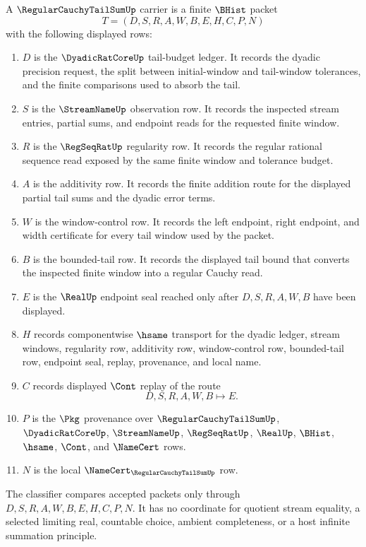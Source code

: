 \begin{definition}
\label{def:regular-cauchy-tail-sum-carrier}
A $\RegularCauchyTailSumUp$ carrier is a finite $\BHist$ packet
$$
T=(D,S,R,A,W,B,E,H,C,P,N)
$$
with the following displayed rows:
\begin{enumerate}
\item $D$ is the $\DyadicRatCoreUp$ tail-budget ledger. It records the dyadic precision request, the split between initial-window and tail-window tolerances, and the finite comparisons used to absorb the tail.
\item $S$ is the $\StreamNameUp$ observation row. It records the inspected stream entries, partial sums, and endpoint reads for the requested finite window.
\item $R$ is the $\RegSeqRatUp$ regularity row. It records the regular rational sequence read exposed by the same finite window and tolerance budget.
\item $A$ is the additivity row. It records the finite addition route for the displayed partial tail sums and the dyadic error terms.
\item $W$ is the window-control row. It records the left endpoint, right endpoint, and width certificate for every tail window used by the packet.
\item $B$ is the bounded-tail row. It records the displayed tail bound that converts the inspected finite window into a regular Cauchy read.
\item $E$ is the $\RealUp$ endpoint seal reached only after $D,S,R,A,W,B$ have been displayed.
\item $H$ records componentwise $\hsame$ transport for the dyadic ledger, stream windows, regularity row, additivity row, window-control row, bounded-tail row, endpoint seal, replay, provenance, and local name.
\item $C$ records displayed $\Cont$ replay of the route
$$
D,S,R,A,W,B \longmapsto E .
$$
\item $P$ is the $\Pkg$ provenance over $\RegularCauchyTailSumUp$, $\DyadicRatCoreUp$, $\StreamNameUp$, $\RegSeqRatUp$, $\RealUp$, $\BHist$, $\hsame$, $\Cont$, and $\NameCert$ rows.
\item $N$ is the local $\NameCert_{\RegularCauchyTailSumUp}$ row.
\end{enumerate}
The classifier compares accepted packets only through $D,S,R,A,W,B,E,H,C,P,N$. It has no coordinate for quotient stream equality, a selected limiting real, countable choice, ambient completeness, or a host infinite summation principle.
\end{definition}

